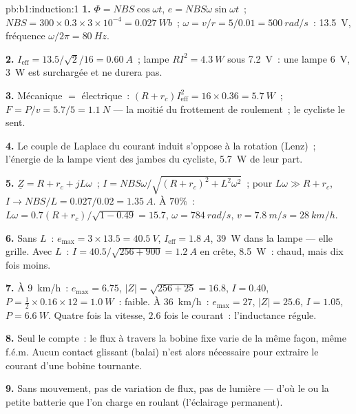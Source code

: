 \begin{solution}{pb:b1:induction:1}
\textbf{1.} $\Phi = NBS\cos\omega t$, $e = NBS\omega\sin\omega t$~; $NBS = 300 \times
0.3 \times 3 \times 10^{-4} = \qty{0.027}{Wb}$~; $\omega = v/r = 5/0.01 = \qty{500}{rad/s}$~:
 \qty{13.5}{V}, fréquence $\omega/2\pi = \qty{80}{Hz}$.

\textbf{2.} $I_{\text{eff}} = 13.5/\sqrt2/16 = \qty{0.60}{A}$~; lampe $RI^2 = \qty{4.3}{W}$
sous \qty{7.2}{V}~: une lampe \qty{6}{V}, \qty{3}{W} est surchargée et ne durera
pas.

\textbf{3.} Mécanique $=$ électrique~: $(R + r_c)I_{\text{eff}}^2 = 16 \times 0.36 =
\qty{5.7}{W}$~; $F = P/v = 5.7/5 = \qty{1.1}{N}$ --- la moitié du frottement de
roulement~; le cycliste le sent.

\textbf{4.} Le couple de Laplace du courant induit s'oppose à la rotation
(Lenz)~; l'énergie de la lampe vient des jambes du cycliste, \qty{5.7}{W} de leur part.

\textbf{5.} $\underline Z = R + r_c + jL\omega$~; $I = NBS\omega/\sqrt{(R + r_c)^2 + L^2\omega^2}$~;
pour $L\omega \gg R + r_c$, $I \to NBS/L = 0.027/0.02 = \qty{1.35}{A}$. À $70\%$~: $L\omega
= 0.7(R + r_c)/\sqrt{1 - 0.49} = 15.7$, $\omega = \qty{784}{rad/s}$, $v = \qty{7.8}{m/s}
= \qty{28}{km/h}$.

\textbf{6.} Sans $L$~: $e_{\max} = 3 \times 13.5 = \qty{40.5}{V}$, $I_{\text{eff}} =
\qty{1.8}{A}$, \qty{39}{W} dans la lampe --- elle grille. Avec $L$~: $I = 40.5/\sqrt{256 +
900} = \qty{1.2}{A}$ en crête, \qty{8.5}{W}~: chaud, mais dix fois moins.

\textbf{7.} À \qty{9}{km/h}~: $e_{\max} = 6.75$, $|Z| = \sqrt{256 + 25} = 16.8$, $I = 0.40$,
$P = \tfrac12 \times 0.16 \times 12 = \qty{1.0}{W}$~: faible. À \qty{36}{km/h}~: $e_{\max} = 27$,
$|Z| = 25.6$, $I = 1.05$, $P = \qty{6.6}{W}$. Quatre fois la vitesse, $2.6$ fois
le courant~: l'inductance régule.

\textbf{8.} Seul le  compte~: le flux à travers la bobine fixe
varie de la même façon, même f.é.m. Aucun contact glissant (balai) n'est alors
nécessaire pour extraire le courant d'une bobine tournante.

\textbf{9.} Sans mouvement, pas de variation de flux, pas de lumière --- d'où le
 ou la petite batterie que l'on charge en roulant (l'éclairage permanent).


\end{solution}
